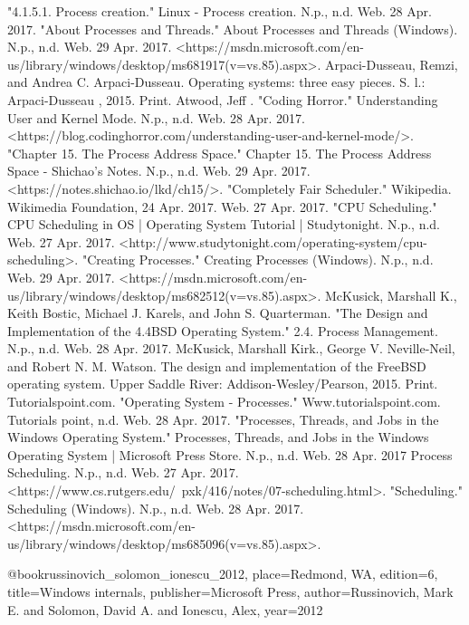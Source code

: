 \documentclass[onecolumn, draftclsnofoot,10pt, compsoc]{IEEEtran}
\begin{document}
\begin{thebibliography}{7}
 "4.1.5.1. Process creation." Linux - Process creation. N.p., n.d. Web. 28 Apr. 2017.
 "About Processes and Threads." About Processes and Threads (Windows). N.p., n.d. Web. 29 Apr.
2017. <https://msdn.microsoft.com/en-us/library/windows/desktop/ms681917(v=vs.85).aspx>.
 Arpaci-Dusseau, Remzi, and Andrea C. Arpaci-Dusseau. Operating systems: three easy pieces. S. l.: Arpaci-Dusseau , 2015. Print.
 Atwood, Jeff . "Coding Horror." Understanding User and Kernel Mode. N.p., n.d. Web. 28 Apr. 2017. <https://blog.codinghorror.com/understanding-user-and-kernel-mode/>.
 "Chapter 15. The Process Address Space." Chapter 15. The Process Address Space - Shichao's Notes. N.p., n.d. Web. 29 Apr. 2017. <https://notes.shichao.io/lkd/ch15/>.
 "Completely Fair Scheduler." Wikipedia. Wikimedia Foundation, 24 Apr. 2017. Web. 27 Apr. 2017.
 "CPU Scheduling." CPU Scheduling in OS | Operating System Tutorial | Studytonight. N.p., n.d. Web. 27 Apr. 2017. <http://www.studytonight.com/operating-system/cpu-scheduling>.
 "Creating Processes." Creating Processes (Windows). N.p., n.d. Web. 29 Apr. 2017. <https://msdn.microsoft.com/en-us/library/windows/desktop/ms682512(v=vs.85).aspx>.
 McKusick, Marshall K., Keith Bostic, Michael J. Karels, and John S. Quarterman. "The Design and Implementation of the 4.4BSD Operating System." 2.4. Process Management. N.p., n.d. Web. 28 Apr. 2017.
    McKusick, Marshall Kirk., George V. Neville-Neil, and Robert N. M. Watson. The design and implementation of the FreeBSD operating system. Upper Saddle River: Addison-Wesley/Pearson, 2015. Print.
    Tutorialspoint.com. "Operating System - Processes." Www.tutorialspoint.com. Tutorials point, n.d. Web. 28 Apr. 2017.
    "Processes, Threads, and Jobs in the Windows Operating System." Processes, Threads, and Jobs in the Windows Operating System | Microsoft Press Store. N.p., n.d. Web. 28 Apr. 2017
    Process Scheduling. N.p., n.d. Web. 27 Apr. 2017. <https://www.cs.rutgers.edu/~pxk/416/notes/07-scheduling.html>.
    "Scheduling." Scheduling (Windows). N.p., n.d. Web. 28 Apr. 2017. <https://msdn.microsoft.com/en-us/library/windows/desktop/ms685096(v=vs.85).aspx>.

@book{russinovich_solomon_ionescu_2012, place={Redmond, WA}, edition={6}, title={Windows internals}, publisher={Microsoft Press}, author={Russinovich, Mark E. and Solomon, David A. and Ionescu, Alex}, year={2012}}

\end{thebibliography}
\end{document}
